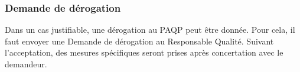     \subsubsection{Demande de dérogation}

    Dans un cas justifiable, une dérogation au PAQP peut être donnée. Pour cela,
il faut envoyer une Demande de dérogation au Responsable Qualité.
    Suivant l'acceptation, des mesures spécifiques seront prises après 
concertation avec le demandeur.
    
\pagebreak
